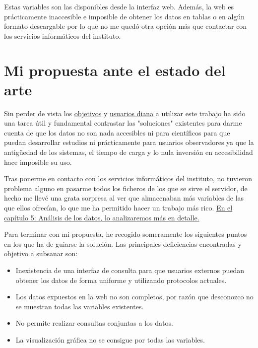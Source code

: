 Estas variables son las disponibles desde la interfaz web. Además, la web es prácticamente inaccesible e imposible de obtener los datos en tablas o en algún formato descargable por lo que no me quedó otra opción más que contactar con los servicios informáticos del instituto.


\section{Mi propuesta ante el estado del arte}

Sin perder de vista los \hyperref[sec:obj]{objetivos} y \hyperref[sec:usu]{usuarios diana} a utilizar este trabajo ha sido una tarea útil y fundamental contrastar las "soluciones" existentes para darme cuenta de que los datos no son nada accesibles ni para científicos para que puedan desarrollar estudios ni prácticamente para usuarios observadores ya que la antigüedad de los sistemas, el tiempo de carga y lo nula inversión en accesibilidad hace imposible su uso.

Tras ponerme en contacto con los servicios informáticos del instituto, no tuvieron problema alguno en pasarme todos los ficheros de los que se sirve el servidor, de hecho me llevé una grata sorpresa al ver que almacenaban más variables de las que ellos ofrecían, lo que me ha permitido hacer un trabajo más rico. \hyperref[cap:5]{En el capítulo 5: Análisis de los datos, lo analizaremos más en detalle.}


Para terminar con mi propuesta, he recogido someramente los siguientes puntos en los que ha de guiarse la solución. Las principales deficiencias encontradas y objetivo a subsanar son:
\begin{itemize}
    \item Inexistencia de una interfaz de consulta para que usuarios externos puedan obtener los datos de forma uniforme y utilizando protocolos actuales.
    \item Los datos expuestos en la web no son completos, por razón que desconozco no se muestran todas las variables existentes.
    \item No permite realizar consultas conjuntas a los datos.
    \item La visualización gráfica no se consigue por todas las variables.
\end{itemize}
